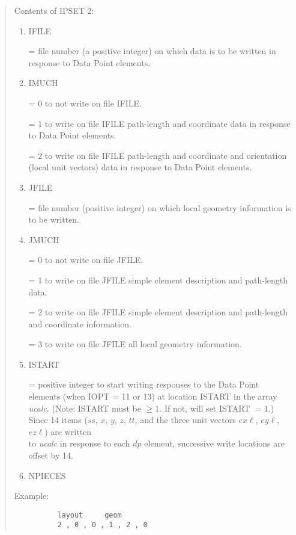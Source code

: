 \begin{quotation}
\vspace{2mm}
Contents of IPSET 2:
\begin{enumerate}
\item IFILE

       = file number (a positive integer) on which data is to be written in response \hspace*{1em}to
	   Data Point elements.

\item IMUCH

       = 0 to not write on file IFILE.

	   = 1 to write on file IFILE path-length and coordinate data in
	   response to \hspace*{1em}Data Point elements.

	   = 2 to write on file IFILE path-length and coordinate and orientation
	   (local \hspace*{1em}unit vectors) data in
	   response to Data Point elements.

\item JFILE

       = file number (positive integer) on which local geometry
	   information is to \hspace*{1em}be written.

\item JMUCH

       = 0 to not write on file JFILE.

	   = 1 to write on file JFILE simple element description and path-length data.

	   = 2 to write on file JFILE simple element description and path-length
	   and \hspace*{1em}coordinate information.

	   = 3 to write on file JFILE all local geometry information.

\item ISTART

       = positive integer to start writing responses to the Data Point
	   elements \hspace*{1em}(when IOPT = 11 or 13) at location ISTART in the array {\em
	   ucalc}.  (Note:  \hspace*{1em}ISTART must be $\geq 1$.  If not, \Mary will set
	   ISTART $= 1$.)  Since 14 \hspace*{1em}items ($ss$, $x$, $y$, $z$, $tt$, and the three unit
	   vectors $ex\ell$, $ey\ell$, $ez\ell$) are written\\ \hspace*{1em}to {\em
	   ucalc} in response to each $dp$ element, successive write locations
	   are \hspace*{1em}offset by 14.

\item NPIECES
\end{enumerate}

\vspace{5mm}
Example:
\begin{verbatim}
          layout     geom
          2 , 0 , 0 , 1 , 2 , 0
\end{verbatim}
\end{quotation}

